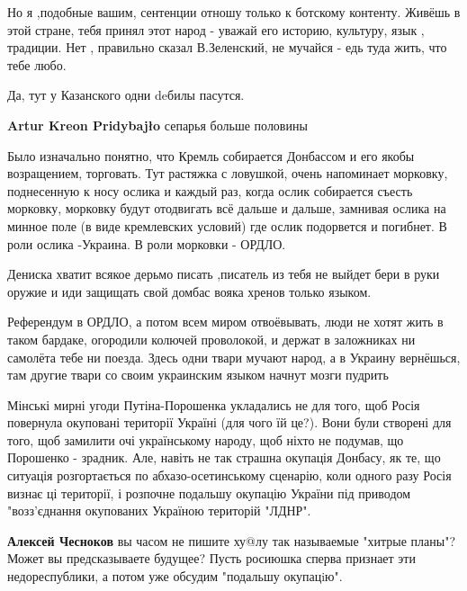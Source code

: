 \begin{itemize}
\begin{itemize}
Но я ,подобные вашим, сентенции отношу только к ботскому контенту. Живёшь в
этой стране, тебя принял этот народ - уважай его историю, культуру, язык ,
традиции. Нет , правильно сказал В.Зеленский, не мучайся - едь туда жить, что
тебе любо.

\end{itemize} %

Да, тут у Казанского одни deбилы пасутся.

\begin{itemize} %
\textbf{Artur Kreon Pridybajło} сепарья больше половины
\end{itemize} %


Было изначально понятно, что Кремль собирается Донбассом и его якобы
возращением, торговать. Тут растяжка с ловушкой, очень напоминает морковку,
поднесенную к носу ослика и каждый раз, когда ослик собирается съесть морковку,
морковку будут отодвигать всё дальше и дальше, замнивая ослика на минное поле
(в виде кремлевских условий) где ослик подорвется и погибнет. В роли ослика
-Украина. В роли морковки - ОРДЛО.


Дениска хватит всякое дерьмо писать ,писатель из тебя не выйдет бери в руки
оружие и иди защищать свой домбас вояка хренов только языком.


Референдум в ОРДЛО, а потом всем миром отвоёвывать, люди не хотят жить в таком
бардаке, огородили колючей проволокой, и держат в заложниках ни самолёта тебе ни
поезда. Здесь одни твари мучают народ, а в Украину вернёшься, там другие твари со
своим украинским языком начнут мозги пудрить


Мінські мирні угоди Путіна-Порошенка укладались не для того, щоб Росія
повернула окуповані території Україні (для чого їй це?). Вони були створені для
того, щоб замилити очі українському народу, щоб ніхто не подумав, що Порошенко
- зрадник. Але, навіть не так страшна окупація Донбасу, як те, що ситуація
розгортається по абхазо-осетинському сценарію, коли одного разу Росія визнає ці
території, і розпочне подальшу окупацію України під приводом "возз'єднання
окупованих Україною територій "ЛДНР".

\begin{itemize} %
\textbf{Алексей Чесноков} вы часом не пишите ху@лу так называемые "хитрые планы"? Может вы предсказываете будущее? Пусть росиюшка сперва признает эти недореспублики, а потом уже обсудим "подальшу окупацiю".


\end{itemize}
\end{itemize}
